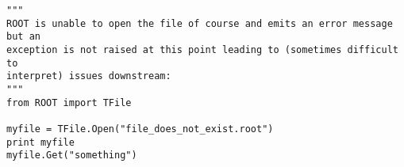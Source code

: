 \begin{footnotesize}
\begin{verbatim}
"""
ROOT is unable to open the file of course and emits an error message but an
exception is not raised at this point leading to (sometimes difficult to
interpret) issues downstream:
"""
from ROOT import TFile

myfile = TFile.Open("file_does_not_exist.root")
print myfile
myfile.Get("something")
\end{verbatim}
\end{footnotesize}
